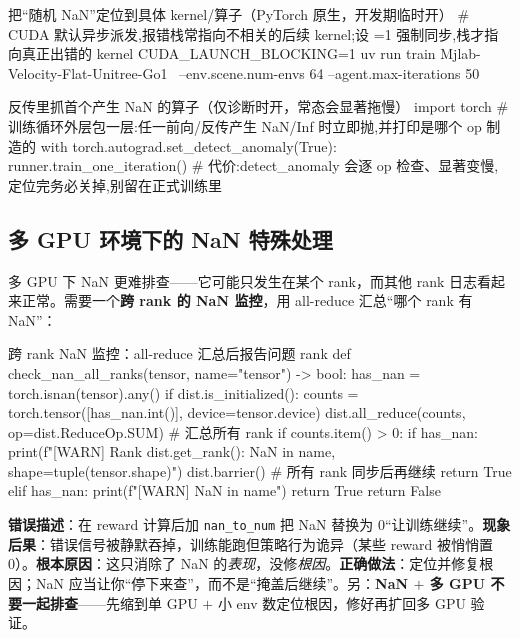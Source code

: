 \begin{codebox}[bash]{把“随机 NaN”定位到具体 kernel/算子（PyTorch 原生，开发期临时开）}
# CUDA 默认异步派发,报错栈常指向不相关的后续 kernel;设 =1 强制同步,栈才指向真正出错的 kernel
CUDA_LAUNCH_BLOCKING=1 uv run train Mjlab-Velocity-Flat-Unitree-Go1 \
    --env.scene.num-envs 64 --agent.max-iterations 50
\end{codebox}

\begin{codebox}[Python]{反传里抓首个产生 NaN 的算子（仅诊断时开，常态会显著拖慢）}
import torch
# 训练循环外层包一层:任一前向/反传产生 NaN/Inf 时立即抛,并打印是哪个 op 制造的
with torch.autograd.set_detect_anomaly(True):
    runner.train_one_iteration()
# 代价:detect_anomaly 会逐 op 检查、显著变慢,定位完务必关掉,别留在正式训练里
\end{codebox}

\subsection{多 GPU 环境下的 NaN 特殊处理}
\label{sec:rlmc-ls-nan-multigpu}

多 GPU 下 NaN 更难排查——它可能只发生在某个 rank，而其他 rank 日志看起来正常。需要一个\textbf{跨 rank 的 NaN 监控}，用 all-reduce 汇总“哪个 rank 有 NaN”：

\begin{codebox}[Python]{跨 rank NaN 监控：all-reduce 汇总后报告问题 rank}
def check_nan_all_ranks(tensor, name="tensor") -> bool:
    has_nan = torch.isnan(tensor).any()
    if dist.is_initialized():
        counts = torch.tensor([has_nan.int()], device=tensor.device)
        dist.all_reduce(counts, op=dist.ReduceOp.SUM)   # 汇总所有 rank
        if counts.item() > 0:
            if has_nan:
                print(f"[WARN] Rank {dist.get_rank()}: NaN in {name}, shape={tuple(tensor.shape)}")
            dist.barrier()                              # 所有 rank 同步后再继续
            return True
    elif has_nan:
        print(f"[WARN] NaN in {name}")
        return True
    return False
\end{codebox}

\begin{pitfall}
\textbf{错误描述}：在 reward 计算后加 \verb|nan_to_num| 把 NaN 替换为 0“让训练继续”。\textbf{现象后果}：错误信号被静默吞掉，训练能跑但策略行为诡异（某些 reward 被悄悄置 0）。\textbf{根本原因}：这只消除了 NaN 的\emph{表现}，没修\emph{根因}。\textbf{正确做法}：定位并修复根因；NaN 应当让你“停下来查”，而不是“掩盖后继续”。另：\textbf{NaN $+$ 多 GPU 不要一起排查}——先缩到单 GPU $+$ 小 env 数定位根因，修好再扩回多 GPU 验证。
\end{pitfall}

